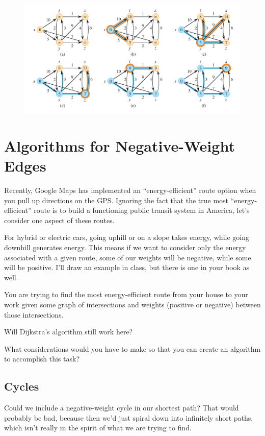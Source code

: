 \documentclass[]{article}
\begin{document}
\begin{figure}[h!]
    \includegraphics[width=\textwidth]{djikstra.png}
\end{figure}


\section*{Algorithms for Negative-Weight Edges}

Recently, Google Maps has implemented an ``energy-efficient'' route option when you pull up directions on the GPS. Ignoring the fact that the true most ``energy-efficient'' route is to build a functioning public transit system in America, let's consider one aspect of these routes.

For hybrid or electric cars, going uphill or on a slope takes energy, while going downhill generates energy. This means if we want to consider only the energy associated with a given route, some of our weights will be negative, while some will be positive. I'll draw an example in class, but there is one in your book as well.

You are trying to find the most energy-efficient route from your house to your work given some graph of intersections and weights (positive or negative) between those intersections. 

Will Dijkstra's algorithm still work here?

What considerations would you have to make so that you can create an algorithm to accomplish this task? 

\subsection*{Cycles}

Could we include a negative-weight cycle in our shortest path? That would probably be bad, because then we'd just spiral down into infinitely short paths, which isn't really in the spirit of what we are trying to find. 
\end{document}
